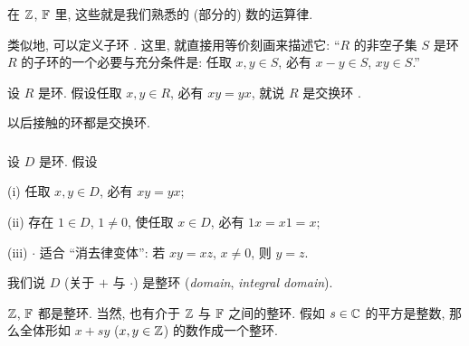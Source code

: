 \begin{example}
    在 $\mathbb{Z}$, $\mathbb{F}$ 里, 这些就是我们熟悉的 (部分的) 数的运算律.
\end{example}

\begin{remark}
    类似地, 可以定义子环 . 这里, 就直接用等价刻画来描述它: ``$R$ 的非空子集 $S$ 是环 $R$ 的子环的一个必要与充分条件是: 任取 $x,y \in S$, 必有 $x-y \in S$, $xy \in S$.''
\end{remark}

\begin{definition}
    设 $R$ 是环. 假设任取 $x,y \in R$, 必有 $xy = yx$, 就说 $R$ 是交换环 .
\end{definition}

\begin{remark}
    以后接触的环都是交换环.
\end{remark}

\subsubsection*{\Domains}

\begin{definition}
    设 $D$ 是环. 假设

    (i) 任取 $x,y \in D$, 必有 $xy = yx$;

    (ii) 存在 $1 \in D$, $1 \neq 0$, 使任取 $x \in D$, 必有 $1x = x1 = x$;

    (iii) $\cdot$ 适合 ``消去律变体'': 若 $xy = xz$, $x \neq 0$, 则 $y = z$.

    我们说 $D$ (关于 $+$ 与 $\cdot$) 是整环 (\textit{domain}, \textit{integral domain}).
\end{definition}

\begin{example}
    $\mathbb{Z}$, $\mathbb{F}$ 都是整环. 当然, 也有介于 $\mathbb{Z}$ 与 $\mathbb{F}$ 之间的整环. 假如 $s \in \mathbb{C}$ 的平方是整数, 那么全体形如 $x + sy$ ($x,y \in \mathbb{Z}$) 的数作成一个整环.
\end{example}

